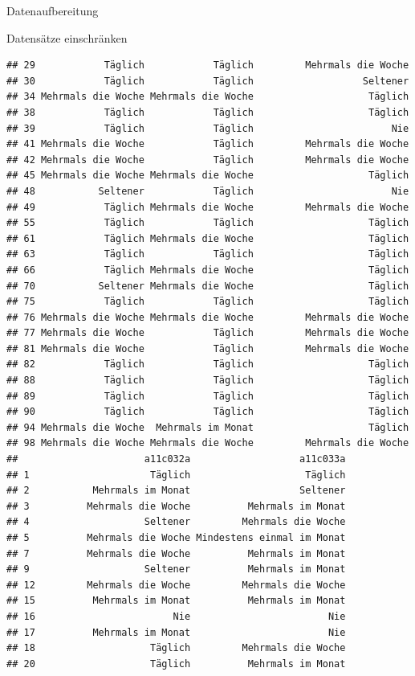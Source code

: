 \documentclass[ignorenonframetext,]{beamer}
\begin{document}
\begin{frame}[fragile]{Datenaufbereitung}
\begin{block}{Datensätze einschränken}
\begin{verbatim}
## 29            Täglich            Täglich         Mehrmals die Woche
## 30            Täglich            Täglich                   Seltener
## 34 Mehrmals die Woche Mehrmals die Woche                    Täglich
## 38            Täglich            Täglich                    Täglich
## 39            Täglich            Täglich                        Nie
## 41 Mehrmals die Woche            Täglich         Mehrmals die Woche
## 42 Mehrmals die Woche            Täglich         Mehrmals die Woche
## 45 Mehrmals die Woche Mehrmals die Woche                    Täglich
## 48           Seltener            Täglich                        Nie
## 49            Täglich Mehrmals die Woche         Mehrmals die Woche
## 55            Täglich            Täglich                    Täglich
## 61            Täglich Mehrmals die Woche                    Täglich
## 63            Täglich            Täglich                    Täglich
## 66            Täglich Mehrmals die Woche                    Täglich
## 70           Seltener Mehrmals die Woche                    Täglich
## 75            Täglich            Täglich                    Täglich
## 76 Mehrmals die Woche Mehrmals die Woche         Mehrmals die Woche
## 77 Mehrmals die Woche            Täglich         Mehrmals die Woche
## 81 Mehrmals die Woche            Täglich         Mehrmals die Woche
## 82            Täglich            Täglich                    Täglich
## 88            Täglich            Täglich                    Täglich
## 89            Täglich            Täglich                    Täglich
## 90            Täglich            Täglich                    Täglich
## 94 Mehrmals die Woche  Mehrmals im Monat                    Täglich
## 98 Mehrmals die Woche Mehrmals die Woche         Mehrmals die Woche
##                      a11c032a                   a11c033a
## 1                     Täglich                    Täglich
## 2           Mehrmals im Monat                   Seltener
## 3          Mehrmals die Woche          Mehrmals im Monat
## 4                    Seltener         Mehrmals die Woche
## 5          Mehrmals die Woche Mindestens einmal im Monat
## 7          Mehrmals die Woche          Mehrmals im Monat
## 9                    Seltener          Mehrmals im Monat
## 12         Mehrmals die Woche         Mehrmals die Woche
## 15          Mehrmals im Monat          Mehrmals im Monat
## 16                        Nie                        Nie
## 17          Mehrmals im Monat                        Nie
## 18                    Täglich         Mehrmals die Woche
## 20                    Täglich          Mehrmals im Monat

\end{verbatim}
\end{block}
\end{frame}
\end{document}
